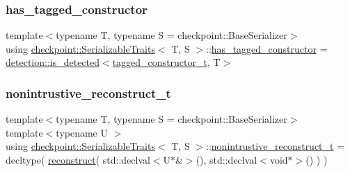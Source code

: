 \subsubsection{\texorpdfstring{has\+\_\+tagged\+\_\+constructor}{has\_tagged\_constructor}}
{\footnotesize\ttfamily template$<$typename T, typename S = checkpoint\+::\+Base\+Serializer$>$ \\
using \hyperlink{structcheckpoint_1_1_serializable_traits}{checkpoint\+::\+Serializable\+Traits}$<$ T, S $>$\+::\hyperlink{structcheckpoint_1_1_serializable_traits_a3388d17f4748bf899e063b3d05e0dbe4}{has\+\_\+tagged\+\_\+constructor} =  \hyperlink{namespacedetection_a30893549a3de1e9603d78dad6d5dce92}{detection\+::is\+\_\+detected}$<$\hyperlink{structcheckpoint_1_1_serializable_traits_a5a1f289a5008468335f22e288a96d861}{tagged\+\_\+constructor\+\_\+t}, T$>$}

\mbox{\label{structcheckpoint_1_1_serializable_traits_abe5231bdf561e55fd9e0673e42a8a96c}} 
\subsubsection{\texorpdfstring{nonintrustive\+\_\+reconstruct\+\_\+t}{nonintrustive\_reconstruct\_t}}
{\footnotesize\ttfamily template$<$typename T, typename S = checkpoint\+::\+Base\+Serializer$>$ \\
template$<$typename U $>$ \\
using \hyperlink{structcheckpoint_1_1_serializable_traits}{checkpoint\+::\+Serializable\+Traits}$<$ T, S $>$\+::\hyperlink{structcheckpoint_1_1_serializable_traits_abe5231bdf561e55fd9e0673e42a8a96c}{nonintrustive\+\_\+reconstruct\+\_\+t} =  decltype( \hyperlink{namespacecheckpoint_a6254f2e220f905a2b0c797c08092a7a1}{reconstruct}( std\+::declval$<$U$\ast$\&$>$(), std\+::declval$<$void$\ast$$>$() ) )}

\mbox{\label{structcheckpoint_1_1_serializable_traits_a3284d2cfd29cfe429d5cf76186d3fe3c}} 
